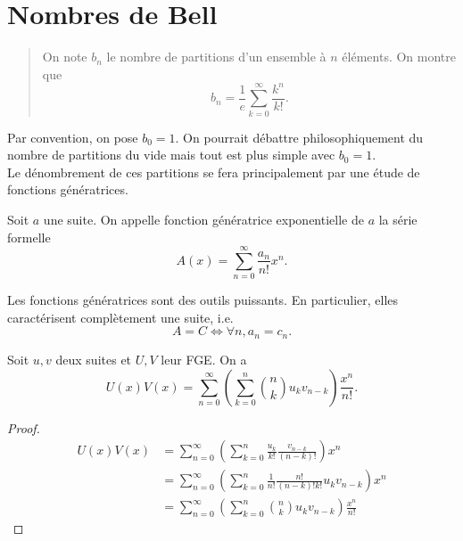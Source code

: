 \documentclass[../main.tex]{subfiles}
\begin{document}
\section{Nombres de Bell}
\begin{abstract} On note \(b_n\) le nombre de partitions d'un ensemble à \(n\) éléments.
    On montre que
    \begin{equation}
        b_n = \frac{1}{e}\sum_{k=0}^{\infty}\frac{k^n}{k!}.
    \end{equation}
\end{abstract}
Par convention, on pose \(b_0=1\). On pourrait débattre philosophiquement du nombre de partitions
du vide mais tout est plus simple avec \(b_0=1\).
\\
Le dénombrement de ces partitions se fera principalement par une étude de 
fonctions génératrices.
\begin{definition} Soit \(a\) une suite. On appelle fonction génératrice exponentielle de \(a\)
    la série formelle
    \begin{equation}
        A(x) = \sum_{n=0}^{\infty}\frac{a_n}{n!}x^n.
    \end{equation}
\end{definition}
Les fonctions génératrices sont des outils puissants. En particulier, elles caractérisent
complètement une suite, i.e.
\begin{equation}
    A = C \iff \forall n, a_n = c_n.
\end{equation}
\begin{lemma} Soit \(u,v\) deux suites et \(U,V\) leur FGE. On a 
    \begin{equation}
        U(x)V(x) = \sum_{n=0}^{\infty}\left(\sum_{k=0}^n \binom{n}{k} u_kv_{n-k}\right)\frac{x^n}{n!}.
    \end{equation}
\end{lemma}
\begin{proof}
    \begin{align}
        U(x)V(x) &= \sum_{n=0}^{\infty}\left(\sum_{k=0}^n \frac{u_k}{k!}\frac{v_{n-k}}{(n-k)!}\right)x^n\\
        & = \sum_{n=0}^{\infty}\left(\sum_{k=0}^n \frac{1}{n!}\frac{n!}{(n-k)!k!}u_{k}v_{n-k}\right)x^n\\
        & = \sum_{n=0}^{\infty}\left(\sum_{k=0}^n \binom{n}{k}u_{k}v_{n-k}\right)\frac{x^n}{n!}
    \end{align}
\end{proof}
\end{document}
